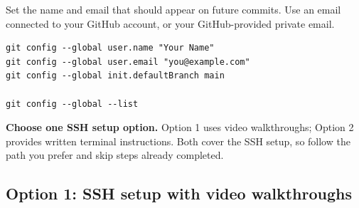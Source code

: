Set the name and email that should appear on future commits. Use an email
connected to your GitHub account, or your GitHub-provided private email.

\begin{lstlisting}[style=utpterminal]
git config --global user.name "Your Name"
git config --global user.email "you@example.com"
git config --global init.defaultBranch main

git config --global --list
\end{lstlisting}

\noindent\textbf{Choose one SSH setup option.} Option 1 uses video walkthroughs; Option 2 provides written terminal instructions. Both cover the SSH setup, so follow the path you prefer and skip steps already completed.

\subsection{Option 1: SSH setup with video walkthroughs}

